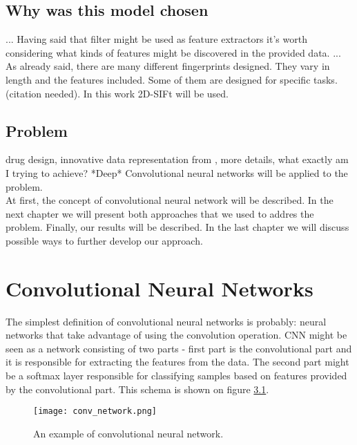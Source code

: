 \documentclass[a4paper,10pt]{report}
\begin{document}
	    \section{Why was this model chosen}
	... Having said that filter might be used as feature extractors it's worth considering what kinds of features might be discovered in the provided data. ...\\
	
    
    As already said, there are many different fingerprints designed. They vary in length and the features included. Some of them are designed for specific tasks. (citation needed). In this work 2D-SIFt will be used.\\
  
    \section{Problem} %
    drug design, innovative data representation from \cite{2DSIFT}, more details, what exactly am I trying to achieve? *Deep* Convolutional neural networks will be applied to the problem.\\
    
    At first, the concept of convolutional neural network will be described. In the next chapter we will present both approaches that we used to addres the problem. Finally, our results will be described. In the last chapter we will discuss possible ways to further develop our approach.
    

  \chapter{Convolutional Neural Networks}
      The simplest definition of convolutional neural networks is probably: neural networks that take advantage of using the convolution operation. CNN might be seen as a network consisting of two parts - first part is the convolutional part and it is responsible for extracting the features from the data. The second part might be a softmax layer responsible for classifying samples based on features provided by the convolutional part. This schema is shown on figure \ref{fig:con_network}.\\
      
     \begin{figure}[h!]
	  \centering
	  \texttt{[image: conv\_network.png]}
	  \caption{An example of convolutional neural network.} %
	  \label{fig:con_network}
	\end{figure} 
      
\end{document}
